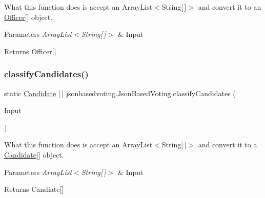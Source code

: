 What this function does is accept an Array\+List$<$\+String\mbox{[}$\,$\mbox{]}$>$ and convert it to an \mbox{\hyperlink{classjsonbasedvoting_1_1_officer}{Officer}}\mbox{[}\mbox{]} object. 
\begin{DoxyParams}{Parameters}
{\em Array\+List$<$\+String\mbox{[}$\,$\mbox{]}$>$} & Input \\
\hline
\end{DoxyParams}
\begin{DoxyReturn}{Returns}
\mbox{\hyperlink{classjsonbasedvoting_1_1_officer}{Officer}}\mbox{[}\mbox{]} 
\end{DoxyReturn}
\mbox{\label{classjsonbasedvoting_1_1_json_based_voting_a09a09c0673c510a648d225136e4cf259}} 
\subsubsection{\texorpdfstring{classifyCandidates()}{classifyCandidates()}}
{\footnotesize\ttfamily static \mbox{\hyperlink{classjsonbasedvoting_1_1_candidate}{Candidate}} \mbox{[}$\,$\mbox{]} jsonbasedvoting.\+Json\+Based\+Voting.\+classify\+Candidates (\begin{DoxyParamCaption}\item[{Array\+List$<$ String\mbox{[}$\,$\mbox{]}$>$}]{Input }\end{DoxyParamCaption})\hspace{0.3cm}{\ttfamily [static]}}

What this function does is accept an Array\+List$<$\+String\mbox{[}$\,$\mbox{]}$>$ and convert it to a \mbox{\hyperlink{classjsonbasedvoting_1_1_candidate}{Candidate}}\mbox{[}\mbox{]} object. 
\begin{DoxyParams}{Parameters}
{\em Array\+List$<$\+String\mbox{[}$\,$\mbox{]}$>$} & Input \\
\hline
\end{DoxyParams}
\begin{DoxyReturn}{Returns}
Candiate\mbox{[}\mbox{]} 
\end{DoxyReturn}
\mbox{\label{classjsonbasedvoting_1_1_json_based_voting_a6f76956192c5ec8d7704c20bcc967d91}} 

